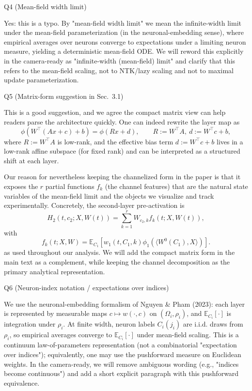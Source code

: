 Q4 (Mean-field width limit)

Yes: this is a typo. By "mean-field width limit" we mean the infinite-width limit under the mean-field parameterization (in the neuronal-embedding sense), where empirical averages over neurons converge to expectations under a limiting neuron measure, yielding a deterministic mean-field ODE. We will reword this explicitly in the camera-ready as "infinite-width (mean-field) limit" and clarify that this refers to the mean-field scaling, not to NTK/lazy scaling and not to maximal update parameterization.

Q5 (Matrix-form suggestion in Sec.~3.1)

This is a good suggestion, and we agree the compact matrix view can help readers parse the architecture quickly. One can indeed rewrite the layer map as
$$
\phi(W^\top(Ax+c)+b)=\phi(Rx+d),\qquad R:=W^\top A,\ d:=W^\top c+b,
$$
where $R:=W^\top A$ is low-rank, and the effective bias term $d:=W^\top c+b$ lives in a low-rank affine subspace (for fixed rank) and can be interpreted as a structured shift at each layer.

Our reason for nevertheless keeping the channelized form in the paper is that it exposes the $r$ partial functions $f_k$ (the channel features) that are the natural state variables of the mean-field limit and the objects we visualize and track experimentally. Concretely, the second-layer pre-activation is
$$
H_2(t,c_2;X,W(t))=\sum_{k=1}^r W_{c_2,k}f_k(t;X,W(t)),
$$
with
$$
f_k(t;X,W)=\mathbb{E}_{C_1}\left[w_1(t,C_1,k)\phi_1(\langle W^0(C_1),X\rangle)\right].
$$
as used throughout our analysis. We will add the compact matrix form in the main text as a complement, while keeping the channel decomposition as the primary analytical representation.

Q6 (Neuron-index notation / expectations over indices)

We use the neuronal-embedding formalism of Nguyen \& Pham (2023): each layer is represented by measurable maps $c\mapsto w(\cdot,c)$ on $(\Omega_i,\rho_i)$, and $\mathbb{E}_{C_i}[\cdot]$ is integration under $\rho_i$. At finite width, neuron labels $C_i(j_i)$ are i.i.d. draws from $\rho_i$, so empirical averages converge to $\mathbb{E}_{C_i}[\cdot]$ under mean-field scaling. This is a continuum law-of-parameters representation (not a combinatorial "expectation over indices"); equivalently, one may use the pushforward measure on Euclidean weights. In the camera-ready, we will remove ambiguous wording (e.g., "indices become continuous") and add a short explicit paragraph with this pushforward equivalence.


